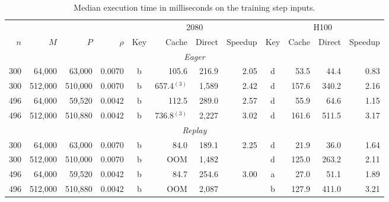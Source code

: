 \begin{table}[!htbp]
\caption{Median execution time in milliseconds on the training step inputs.}
\label{tab:main_step}
\footnotesize
\setlength{\tabcolsep}{2.5pt}
\begin{tabular}{rrrr crrr crrr}
\toprule
 &  &  &  & \multicolumn{4}{c}{2080} & \multicolumn{4}{c}{H100} \\
\cmidrule(lr){5-8} \cmidrule(lr){9-12}
$n$ & $M$ & $P$ & $\rho$ & Key & Cache & Direct & Speedup & Key & Cache & Direct & Speedup \\
\midrule
\multicolumn{12}{c}{\textit{Eager}} \\
300 & 64,000 & 63,000 & 0.0070 & b & 105.6 & 216.9 & 2.05 & d & 53.5 & 44.4 & 0.83 \\
300 & 512,000 & 510,000 & 0.0070 & b & 657.4$^{(3)}$ & 1,589 & 2.42 & d & 157.6 & 340.2 & 2.16 \\
496 & 64,000 & 59,520 & 0.0042 & b & 112.5 & 289.0 & 2.57 & d & 55.9 & 64.6 & 1.15 \\
496 & 512,000 & 510,880 & 0.0042 & b & 736.8$^{(3)}$ & 2,227 & 3.02 & d & 161.6 & 511.5 & 3.17 \\
\midrule
\multicolumn{12}{c}{\textit{Replay}} \\
300 & 64,000 & 63,000 & 0.0070 & b & 84.0 & 189.1 & 2.25 & d & 21.9 & 36.0 & 1.64 \\
300 & 512,000 & 510,000 & 0.0070 & b & OOM & 1,482 &  & d & 125.0 & 263.2 & 2.11 \\
496 & 64,000 & 59,520 & 0.0042 & b & 84.7 & 254.6 & 3.00 & a & 27.0 & 51.1 & 1.89 \\
496 & 512,000 & 510,880 & 0.0042 & b & OOM & 2,087 &  & b & 127.9 & 411.0 & 3.21 \\
\bottomrule
\end{tabular}
\end{table}